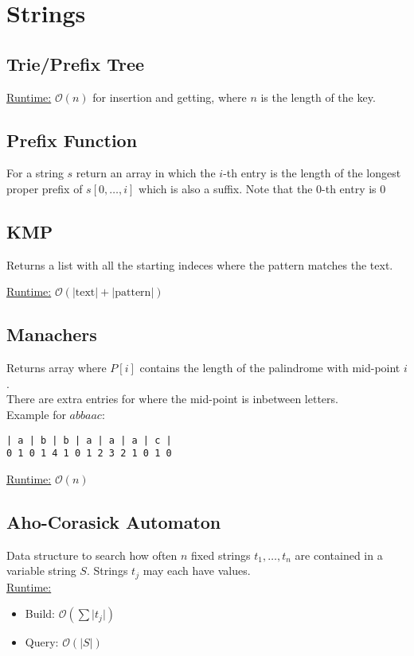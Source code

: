 \section{Strings}
\subsection{Trie/Prefix Tree}
\underline{Runtime:} $\mathcal{O}(n)$ for insertion and getting, where
$n$ is the length of the key.

\subsection{Prefix Function}
For a string $s$ return an array in which the $i$-th entry is the
length of the longest proper prefix of $s[0,\ldots, i]$ which is also
a suffix.  Note that the $0$-th entry is $0$

\subsection{KMP}
Returns a list with all the starting indeces where the pattern matches
the text.

\underline{Runtime:} $\mathcal{O}(\left| \text{text} \right| + \left|
  \text{pattern} \right|)$

\subsection{Manachers}
Returns array where $P[i]$ contains the length of the palindrome with mid-point $i$.\\
There are extra entries for where the mid-point is inbetween letters.\\
Example for $abbaac$:
\begin{lstlisting}
| a | b | b | a | a | a | c |
0 1 0 1 4 1 0 1 2 3 2 1 0 1 0
\end{lstlisting}
\underline{Runtime:} $\mathcal{O}(n)$
\subsection{Aho-Corasick Automaton}
Data structure to search how often $n$ fixed strings $t_1, \dots, t_n$ are contained in a variable string $S$. Strings $t_j$ may each have values.\\
\underline{Runtime:}
\begin{itemize}
	\item Build: $\mathcal{O}(\sum \lvert t_j \rvert)$
	\item Query: $\mathcal{O}(\lvert S \rvert)$
\end{itemize}

